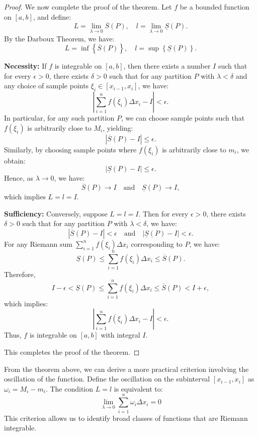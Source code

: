 \documentclass[oneside]{book}
\begin{document}
\begin{proof}
We now complete the proof of the theorem. Let \( f \) be a bounded function on \([a,b]\), and define:
\[
L = \lim_{\lambda \to 0} \overline{S}(P), \quad l = \lim_{\lambda \to 0} \underline{S}(P).
\]
By the Darboux Theorem, we have:
\[
L = \inf \left\{ \overline{S}(P) \right\}, \quad l = \sup \left\{ \underline{S}(P) \right\}.
\]

\noindent \textbf{Necessity:} If \( f \) is integrable on \([a,b]\), then there exists a number \( I \) such that for every \( \epsilon > 0 \), there exists \( \delta > 0 \) such that for any partition \( P \) with \( \lambda < \delta \) and any choice of sample points \( \xi_i \in [x_{i-1}, x_i] \), we have:
\[
\left| \sum_{i=1}^{n} f(\xi_i) \Delta x_i - I \right| < \epsilon.
\]
In particular, for any such partition \( P \), we can choose sample points such that \( f(\xi_i) \) is arbitrarily close to \( M_i \), yielding:
\[
\left| \overline{S}(P) - I \right| \leq \epsilon.
\]
Similarly, by choosing sample points where \( f(\xi_i) \) is arbitrarily close to \( m_i \), we obtain:
\[
\left| \underline{S}(P) - I \right| \leq \epsilon.
\]
Hence, as \( \lambda \to 0 \), we have:
\[
\overline{S}(P) \to I \quad \text{and} \quad \underline{S}(P) \to I,
\]
which implies \( L = l = I \).

\noindent \textbf{Sufficiency:} Conversely, suppose \( L = l = I \). Then for every \( \epsilon > 0 \), there exists \( \delta > 0 \) such that for any partition \( P \) with \( \lambda < \delta \), we have:
\[
\left| \overline{S}(P) - I \right| < \epsilon \quad \text{and} \quad \left| \underline{S}(P) - I \right| < \epsilon.
\]
For any Riemann sum \( \sum_{i=1}^{n} f(\xi_i) \Delta x_i \) corresponding to \( P \), we have:
\[
\underline{S}(P) \leq \sum_{i=1}^{n} f(\xi_i) \Delta x_i \leq \overline{S}(P).
\]
Therefore,
\[
I - \epsilon < \underline{S}(P) \leq \sum_{i=1}^{n} f(\xi_i) \Delta x_i \leq \overline{S}(P) < I + \epsilon,
\]
which implies:
\[
\left| \sum_{i=1}^{n} f(\xi_i) \Delta x_i - I \right| < \epsilon.
\]
Thus, \( f \) is integrable on \([a,b]\) with integral \( I \).

This completes the proof of the theorem.
\end{proof}

From the theorem above, we can derive a more practical criterion involving the oscillation of the function. Define the oscillation on the subinterval $[x_{i-1}, x_i]$ as $\omega_i = M_i - m_i$. The condition $L=l$ is equivalent to:
\[
\lim_{\lambda \to 0} \sum_{i=1}^n \omega_i \Delta x_i = 0
\]
This criterion allows us to identify broad classes of functions that are Riemann integrable.
\end{document}
